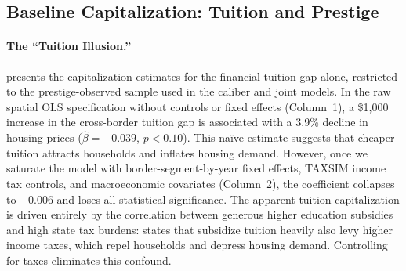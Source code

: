 \documentclass[12pt]{article}
\begin{document}
\subsection{Baseline Capitalization: Tuition and Prestige}

\paragraph{The ``Tuition Illusion.''}  presents the capitalization estimates for the financial tuition gap alone, restricted to the prestige-observed sample used in the caliber and joint models. In the raw spatial OLS specification without controls or fixed effects (Column~1), a \$1,000 increase in the cross-border tuition gap is associated with a 3.9\% decline in housing prices ($\hat{\beta} = -0.039$, $p < 0.10$). This na\"ive estimate suggests that cheaper tuition attracts households and inflates housing demand. However, once we saturate the model with border-segment-by-year fixed effects, TAXSIM income tax controls, and macroeconomic covariates (Column~2), the coefficient collapses to $-0.006$ and loses all statistical significance. The apparent tuition capitalization is driven entirely by the correlation between generous higher education subsidies and high state tax burdens: states that subsidize tuition heavily also levy higher income taxes, which repel households and depress housing demand. Controlling for taxes eliminates this confound.
\end{document}
